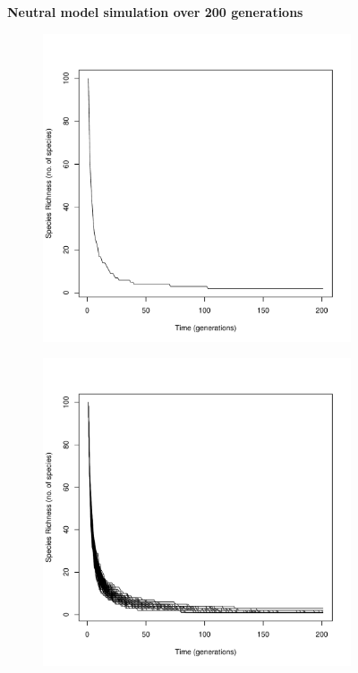 \documentclass{article}
\begin{document}
	\begin{figure}[H]
			\centering %
			\textbf{Neutral model simulation over 200 generations}\par\medskip
			\begin{subfigure}[t]{0.49\linewidth}
				\includegraphics[width=\linewidth]{../Results/time_series.pdf}
				\caption{}
			\end{subfigure}
			\begin{subfigure}[t]{0.49\linewidth}
				\includegraphics[width=\linewidth]{../Results/time_series2.pdf}

\end{subfigure}
\end{figure}
\end{document}
